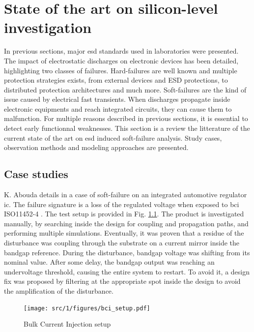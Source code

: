\section{State of the art on silicon-level investigation}

In previous sections, major \gls{esd} standards used in laboratories were presented.
The impact of electrostatic discharges on electronic devices has been detailed, highlighting two classes of failures.
Hard-failures are well known and multiple protection strategies exists, from external devices and ESD protections, to distributed protection architectures and much more.
Soft-failures are the kind of issue caused by electrical fast transients.
When discharges propagate inside electronic equipments and reach integrated circuits, they can cause them to malfunction.
For multiple reasons described in previous sections, it is essential to detect early functionnal weaknesses.
This section is a review the litterature of the current state of the art on \gls{esd} induced soft-failure analysis.
Study cases, observation methods and modeling approaches are presented.

\subsection{Case studies}

K. Abouda details in \cite{softfailEMCIC} a case of soft-failure on an integrated automotive regulator \gls{ic}.
The failure signature is a loss of the regulated voltage when exposed to \gls{bci} ISO11452-4 \cite{iso11452}.
The test setup is provided in Fig. \ref{}.
The product is investigated manually, by searching inside the design for coupling and propagation paths, and performing multiple simulations.
Eventually, it was proven that a residue of the disturbance was coupling through the substrate on a current mirror inside the bandgap reference.
During the disturbance, bandgap voltage was shifting from its nominal value.
After some delay, the bandgap output was reaching an undervoltage threshold, causing the entire system to restart.
To avoid it, a design fix was proposed by filtering at the appropriate spot inside the design to avoid the amplification of the disturbance.

\begin{figure}[!h]
  \centering
  \texttt{[image: src/1/figures/bci\_setup.pdf]}
  \caption{Bulk Current Injection setup}
  \label{fig:bci-setup}
\end{figure}


